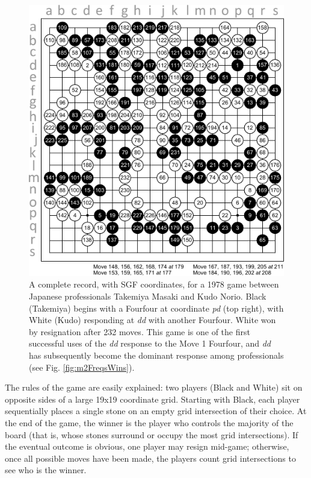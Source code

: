 \documentclass[reqno,12pt]{amsart}
\begin{document}
\begin{figure}[t]
  \begin{center}
    \includegraphics[scale=1.3]{./assets/kifu.pdf}
    \caption{A complete record, with SGF coordinates, for a 1978 game between Japanese professionals Takemiya Masaki and Kudo Norio. Black (Takemiya) begins with a Fourfour at coordinate \textit{pd} (top right), with White (Kudo) responding at \textit{dd} with another Fourfour. White won by resignation after 232 moves. This game is one of the first successful uses of the \textit{dd} response to the Move 1 Fourfour, and \textit{dd} has subsequently become the dominant response among professionals (see Fig. \ref{fig:m2FreqsWins}).}
    \label{fig:kifu}
  \end{center}
\end{figure}

The rules of the game are easily explained: two players (Black and White) sit on opposite sides of a large 19x19 coordinate grid. Starting with Black, each player sequentially places a single stone on an empty grid intersection of their choice. At the end of the game, the winner is the player who controls the majority of the board (that is, whose stones surround or occupy the most grid intersections). If the eventual outcome is obvious, one player may resign mid-game; otherwise, once all possible moves have been made, the players count grid intersections to see who is the winner.
\end{document}
